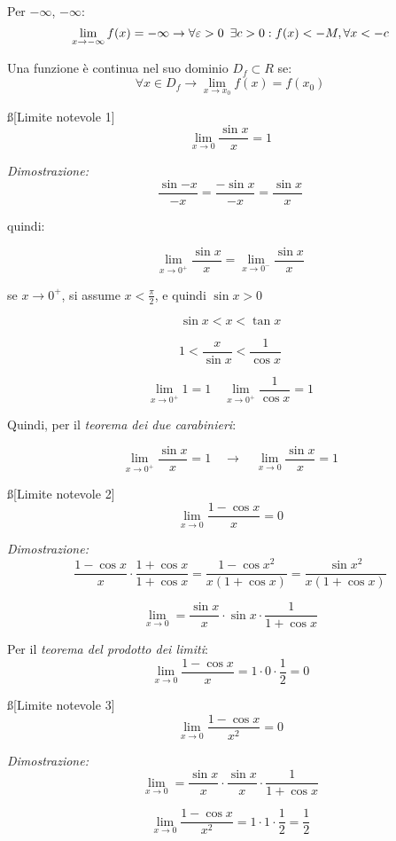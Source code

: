 \documentclass[12pt]{article}
\begin{document}
Per $-\infty$, $-\infty$:
$$ \lim_{x \to -\infty} f(x) = -\infty \rightarrow \forall \varepsilon > 0 \hspace{0.5em} \exists c > 0: f(x) < -M, \forall x < -c $$

\s[Continuità]
Una funzione è continua nel suo dominio $D_f \subset R$ se:
$$ \forall x \in D_f \rightarrow \lim_{x \to x_0} f(x) = f(x_0) $$

\ss[Limite notevole 1]
$$ \lim_{x \to 0} \frac{\sin{x}}{x} = 1 $$

\textit{Dimostrazione:}
$$ \frac{\sin{-x}}{-x} = \frac{-\sin{x}}{-x} = \frac{\sin{x}}{x} $$

quindi:

$$ \lim_{x \to 0^{+}} \frac{\sin{x}}{x} = \lim_{x \to 0^{-}} \frac{\sin{x}}{x} $$

se $x\to 0^{+}$, si assume $x < \frac{\pi}{2}$, e quindi $\sin{x} > 0$

$$ \sin{x} < x < \tan{x} $$

$$ 1 < \frac{x}{\sin{x}} < \frac{1}{\cos{x}} $$

$$ \lim_{x \to 0^{+}} 1 = 1 \hspace{1em} \lim_{x \to 0^{+}} \frac{1}{\cos{x}} = 1 $$

Quindi, per il \textit{teorema dei due carabinieri}:

$$ \lim_{x \to 0^{+}} \frac{\sin{x}}{x} = 1 \hspace{1em} \rightarrow \hspace{1em} \lim_{x \to 0} \frac{\sin{x}}{x} = 1 $$

\ss[Limite notevole 2]
$$ \lim_{x \to 0} \frac{1 - \cos{x}}{x} = 0 $$

\textit{Dimostrazione:}
$$ \frac{1 - \cos{x}}{x} \cdot \frac{1 + \cos{x}}{1 + \cos{x}} = \frac{1 - \cos{x}^2}{x(1 + \cos{x})} = \frac{\sin{x}^2}{x(1 + \cos{x})} $$

$$ \lim_{x \to 0} = \frac{\sin{x}}{x} \cdot \sin{x} \cdot \frac{1}{1+\cos{x}} $$

Per il \textit{teorema del prodotto dei limiti}:
$$ \lim_{x \to 0} \frac{1 - \cos{x}}{x} = 1 \cdot 0 \cdot \frac{1}{2} = 0 $$

\ss[Limite notevole 3]
$$ \lim_{x \to 0} \frac{1 - \cos{x}}{x^2} = 0 $$

\textit{Dimostrazione:}
$$ \lim_{x \to 0} = \frac{\sin{x}}{x} \cdot \frac{\sin{x}}{x} \cdot \frac{1}{1+\cos{x}} $$

$$ \lim_{x \to 0} \frac{1 - \cos{x}}{x^2} = 1 \cdot 1 \cdot \frac{1}{2} = \frac{1}{2} $$
\end{document}
